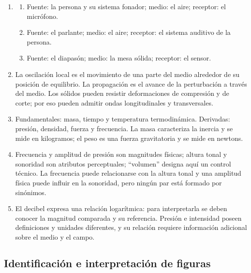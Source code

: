 \begin{enumerate}[label=\textbf{C\arabic*.},leftmargin=*]
    \item
    \begin{enumerate}[label=\alph*)]
        \item Fuente: la persona y su sistema fonador; medio: el aire; receptor: el micrófono.
        \item Fuente: el parlante; medio: el aire; receptor: el sistema auditivo de la persona.
        \item Fuente: el diapasón; medio: la mesa sólida; receptor: el sensor.
    \end{enumerate}

    \item La oscilación local es el movimiento de una parte del medio alrededor de su posición de equilibrio. La propagación es el avance de la perturbación a través del medio. Los sólidos pueden resistir deformaciones de compresión y de corte; por eso pueden admitir ondas longitudinales y transversales.

    \item Fundamentales: masa, tiempo y temperatura termodinámica. Derivadas: presión, densidad, fuerza y frecuencia. La masa caracteriza la inercia y se mide en kilogramos; el peso es una fuerza gravitatoria y se mide en newtons.

    \item Frecuencia y amplitud de presión son magnitudes físicas; altura tonal y sonoridad son atributos perceptuales; ``volumen'' designa aquí un control técnico. La frecuencia puede relacionarse con la altura tonal y una amplitud física puede influir en la sonoridad, pero ningún par está formado por sinónimos.

    \item El decibel expresa una relación logarítmica: para interpretarla se deben conocer la magnitud comparada y su referencia. Presión e intensidad poseen definiciones y unidades diferentes, y su relación requiere información adicional sobre el medio y el campo.
\end{enumerate}

\subsection*{Identificación e interpretación de figuras}

